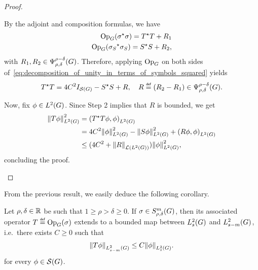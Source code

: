 \begin{proof}
\begin{description}
            By the adjoint and composition formulas,
            we have
            \begin{align*}
                \Op(\adj \sigma \sigma) = \adj T T + R_1\\
                \Op(\adj {\sigma_S} \sigma_S) = \adj S S +  R_2,
            \end{align*}
            with $R_1, R_2 \in \OperatorClass {\rho - \delta} {\rho, \delta}$.
            Therefore, applying $\Op$ on both sides of~\eqref{eq:decomposition_of_unity_in_terms_of_symbols_squared} yields
            \begin{align*}
                \adj T T = 4 C^2 \Id {\Schwartz \Group} - \adj S S + R,
                \quad R \defeq (R_2 - R_1) \in \OperatorClass {\rho - \delta} {\rho, \delta}.
            \end{align*}

            Now, fix $\phi \in \Lebesgue 2 \Group$.
            Since Step 2 implies that $R$ is bounded,
            we get
            \begin{align*}
                \norm [\Lebesgue 2 \Group] {T \phi}^2
                &= \ip [\Lebesgue 2 \Group] {\adj T T \phi} \phi\\
                &= 4 C^2 \norm [\Lebesgue 2 \Group] \phi^2 - \norm [\Lebesgue 2 \Group] {S \phi}^2 + \ip [\Lebesgue 2 \Group] {R \phi} {\phi}\\
                &\leq (4 C^2 + \norm [\Lin {\Lebesgue 2 \Group}] R) \norm [\Lebesgue 2 \Group] \phi^2,
            \end{align*}
            concluding the proof.
    \end{description}
\end{proof}

From the previous result,
we easily deduce the following corollary.

\begin{theorem}
\label{theorem:L2_boundedness}
    Let $\rho, \delta \in \R$ be such that $1 \geq \rho > \delta \geq 0$.
    If $\sigma \in \SymbolClass m {\rho, \delta}$,
    then its associated operator $T \defeq \Op(\sigma)$ extends to a bounded map
    between $\Sobolev s$ and $\Sobolev {s - m}$,
    i.e.\ there exists $C \geq 0$ such that
    \begin{align*}
        \norm [\Sobolev {s - m}] {T \phi} \leq C \norm [\Sobolev s] \phi.
    \end{align*}
    for every $\phi \in \Schwartz \Group$.
\end{theorem}

